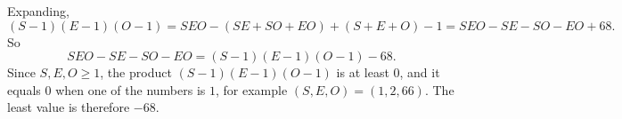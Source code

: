 Expanding,
\[(S-1)(E-1)(O-1)=SEO-(SE+SO+EO)+(S+E+O)-1=SEO-SE-SO-EO+68 .\]
So
\[SEO-SE-SO-EO=(S-1)(E-1)(O-1)-68 .\]
Since $S,E,O\ge1$, the product $(S-1)(E-1)(O-1)$ is at least $0$, and it equals $0$ when one of the numbers is $1$, for example $(S,E,O)=(1,2,66)$. The least value is therefore $\boxed{-68}$.
